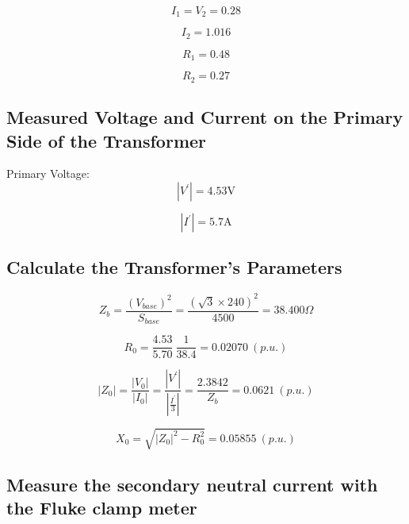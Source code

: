 \documentclass{article}
\begin{document}
\begin{equation}
  I_1 = V_2 = 0.28
\end{equation}

\begin{equation}
  I_2 = 1.016
\end{equation}

\begin{equation}
  R_1 = 0.48
\end{equation}

\begin{equation}
  R_2 = 0.27
\end{equation}

\subsection{Measured Voltage and Current on the Primary Side of the Transformer}

Primary Voltage:
\begin{equation}
  | V^{'} | = 4.53 \text{V}
\end{equation} 

\begin{equation}
  | I^{'} | = 5.7 \text{A}
\end{equation} 

\subsection{Calculate the Transformer's Parameters} 

\begin{equation}
  Z_b = \frac{ \left( V_{base} \right)^2  }{S_{base}} = \frac{\left( \sqrt{3} \times 240 \right)^2}{4500} = 38.400 \Omega
\end{equation}

\begin{equation}
  R_0 = \frac{4.53}{5.70} \ \frac{1}{38.4} = 0.02070 \ (p.u.)
\end{equation}

\begin{equation}
  |Z_0 | = \frac{| V_0 |}{| I_0 |} = \frac{| V^{'} |}{| \frac{I^{'}}{3} |} = \frac{2.3842}{Z_b} = 0.0621 \ (p.u.)
\end{equation}

\begin{equation}
  X_{0} = \sqrt{| Z_0 |^{2} - R^2_0} = 0.05855  \ (p.u.)
\end{equation}

\subsection{Measure the secondary neutral current with the Fluke clamp meter} 
\end{document}
